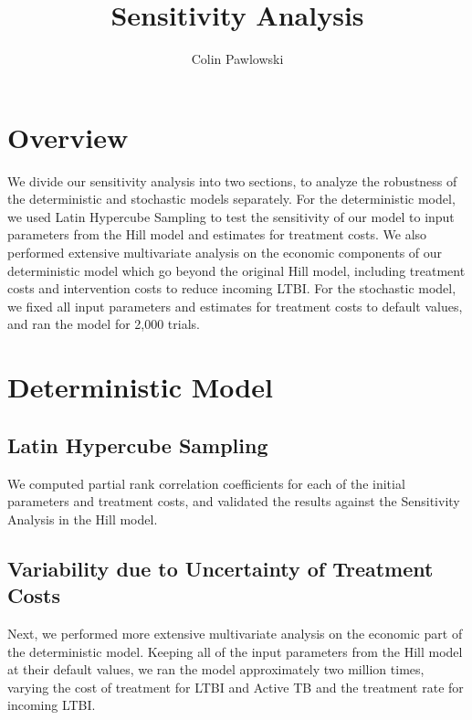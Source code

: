 \documentclass{article}[11pt]
\begin{document}
\title{Sensitivity Analysis}
\author{Colin Pawlowski}
\date{}
\maketitle


\section{Overview}
We divide our sensitivity analysis into two sections, to analyze the robustness of the deterministic and stochastic models separately.  For the deterministic model, we used Latin Hypercube Sampling to test the sensitivity of our model to input parameters from the Hill model and estimates for treatment costs.  We also
performed extensive multivariate analysis on the economic components of our deterministic model which go beyond the original Hill model, including treatment costs and intervention costs to reduce incoming LTBI.  
For the stochastic model, we fixed all input parameters and estimates for treatment costs to default values, and ran the model for 2,000 trials.  

\section{Deterministic Model}
\subsection{Latin Hypercube Sampling}
We computed partial rank correlation coefficients for each of the initial parameters and treatment costs, and validated the results against the Sensitivity Analysis in the Hill model.  \\


\subsection{Variability due to Uncertainty of Treatment Costs}
Next, we performed more extensive multivariate analysis on the economic part of the deterministic model.  Keeping all of the input parameters from the Hill model at their default values, we ran the model approximately two million times, varying the cost of treatment for LTBI and Active TB and the treatment rate for incoming LTBI.  \\
\end{document}
